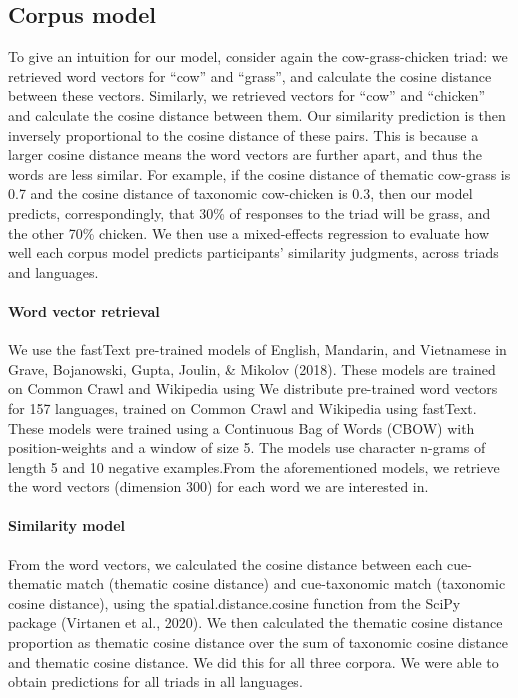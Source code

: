 \documentclass[10pt, letterpaper]{article}
\begin{document}
\hypertarget{corpus-model}{%
\subsection{Corpus model}\label{corpus-model}}

To give an intuition for our model, consider again the cow-grass-chicken
triad: we retrieved word vectors for ``cow'' and ``grass'', and
calculate the cosine distance between these vectors. Similarly, we
retrieved vectors for ``cow'' and ``chicken'' and calculate the cosine
distance between them. Our similarity prediction is then inversely
proportional to the cosine distance of these pairs. This is because a
larger cosine distance means the word vectors are further apart, and
thus the words are less similar. For example, if the cosine distance of
thematic cow-grass is 0.7 and the cosine distance of taxonomic
cow-chicken is 0.3, then our model predicts, correspondingly, that 30\%
of responses to the triad will be grass, and the other 70\% chicken. We
then use a mixed-effects regression to evaluate how well each corpus
model predicts participants' similarity judgments, across triads and
languages.

\hypertarget{word-vector-retrieval}{%
\paragraph{Word vector retrieval}\label{word-vector-retrieval}}

We use the fastText pre-trained models of English, Mandarin, and
Vietnamese in Grave, Bojanowski, Gupta, Joulin, \& Mikolov (2018). These
models are trained on Common Crawl and Wikipedia using We distribute
pre-trained word vectors for 157 languages, trained on Common Crawl and
Wikipedia using fastText. These models were trained using a Continuous
Bag of Words (CBOW) with position-weights and a window of size 5. The
models use character n-grams of length 5 and 10 negative examples.From
the aforementioned models, we retrieve the word vectors (dimension 300)
for each word we are interested in.

\hypertarget{similarity-model}{%
\paragraph{Similarity model}\label{similarity-model}}

From the word vectors, we calculated the cosine distance between each
cue-thematic match (thematic cosine distance) and cue-taxonomic match
(taxonomic cosine distance), using the spatial.distance.cosine function
from the SciPy package (Virtanen et al., 2020). We then calculated the
thematic cosine distance proportion as thematic cosine distance over the
sum of taxonomic cosine distance and thematic cosine distance. We did
this for all three corpora. We were able to obtain predictions for all
triads in all languages.
\end{document}
